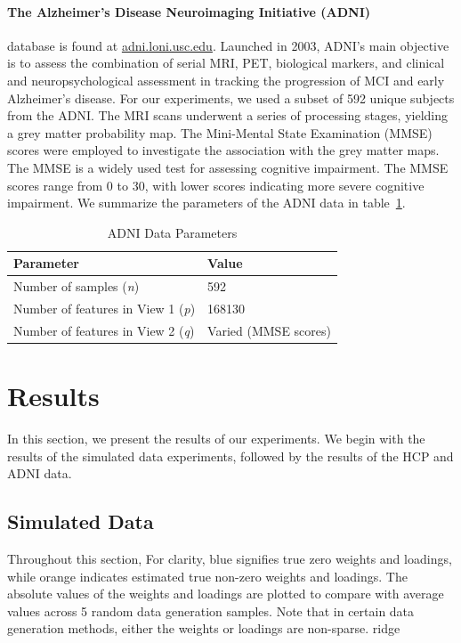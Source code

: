 \paragraph{The Alzheimer’s Disease Neuroimaging Initiative (ADNI)} database is found at \url{adni.loni.usc.edu}.
Launched in 2003, ADNI's main objective is to assess the combination of serial MRI, PET, biological markers, and clinical and neuropsychological assessment in tracking the progression of MCI and early Alzheimer’s disease.
For our experiments, we used a subset of 592 unique subjects from the ADNI. The MRI scans underwent a series of processing stages, yielding a grey matter probability map.
The Mini-Mental State Examination (MMSE) scores were employed to investigate the association with the grey matter maps.
The MMSE is a widely used test for assessing cognitive impairment.
The MMSE scores range from 0 to 30, with lower scores indicating more severe cognitive impairment.
We summarize the parameters of the ADNI data in table~\ref{table:adni-parameters}.

\begin{table}
\centering
\caption{ADNI Data Parameters}
\begin{tabular}{| l | l |}
\hline
\textbf{Parameter} & \textbf{Value} \\
\hline
Number of samples (\textit{n}) & 592 \\
Number of features in View 1 (\textit{p}) & 168130 \\
Number of features in View 2 (\textit{q}) & Varied (MMSE scores) \\
\hline
\end{tabular}\label{table:adni-parameters}
\end{table}

\section{Results}

In this section, we present the results of our experiments.
We begin with the results of the simulated data experiments, followed by the results of the HCP and ADNI data.

\subsection{Simulated Data}

Throughout this section, For clarity, blue signifies true zero weights and loadings, while orange indicates estimated true non-zero weights and loadings.
The absolute values of the weights and loadings are plotted to compare with average values across 5 random data generation samples.
Note that in certain data generation methods, either the weights or loadings are non-sparse.
ridge
